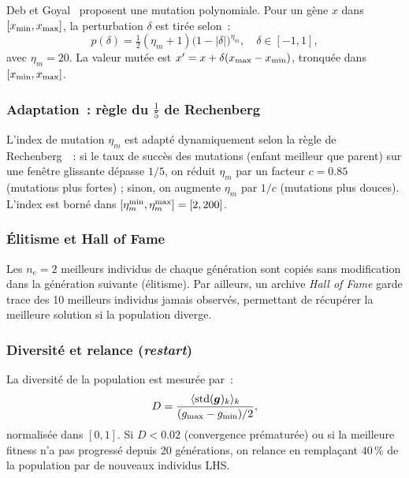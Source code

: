 \documentclass[12pt,a4paper]{article}
\begin{document}
Deb et Goyal~\cite{DebGoyal1996} proposent une mutation polynomiale. Pour un gène
$x$ dans $[x_{\rm min}, x_{\rm max}]$, la perturbation $\delta$ est tirée selon~:
\begin{equation}
    p(\delta) = \tfrac{1}{2}(\eta_m+1)\bigl(1-|\delta|\bigr)^{\eta_m},
    \quad \delta \in [-1, 1],
    \label{eq:pm-pdf}
\end{equation}
avec $\eta_m = 20$. La valeur mutée est $x' = x + \delta(x_{\rm max} - x_{\rm min})$,
tronquée dans $[x_{\rm min}, x_{\rm max}]$.

\subsubsection{Adaptation~: règle du $\frac{1}{5}$ de Rechenberg}

L'index de mutation $\eta_m$ est adapté dynamiquement selon la règle de
Rechenberg~\cite{Rechenberg1973}~: si le taux de succès des mutations (enfant meilleur
que parent) sur une fenêtre glissante dépasse $1/5$, on réduit $\eta_m$ par un facteur
$c = 0.85$ (mutations plus fortes) ; sinon, on augmente $\eta_m$ par $1/c$
(mutations plus douces). L'index est borné dans $[\eta_m^{\rm min}, \eta_m^{\rm max}]
= [2, 200]$.

\subsubsection{Élitisme et Hall of Fame}

Les $n_e = 2$ meilleurs individus de chaque génération sont copiés sans modification
dans la génération suivante (élitisme). Par ailleurs, un archive \textit{Hall of Fame}
garde trace des 10 meilleurs individus jamais observés, permettant de récupérer la
meilleure solution si la population diverge.

\subsubsection{Diversité et relance (\textit{restart})}

La diversité de la population est mesurée par~:
\begin{equation}
    D = \frac{\langle\mathrm{std}(\bm{g})_k\rangle_k}{(g_{\rm max}-g_{\rm min})/2},
    \label{eq:diversity}
\end{equation}
normalisée dans $[0, 1]$. Si $D < 0.02$ (convergence prématurée) ou si la meilleure
fitness n'a pas progressé depuis 20 générations, on relance en remplaçant $40\,\%$
de la population par de nouveaux individus LHS.
\end{document}
